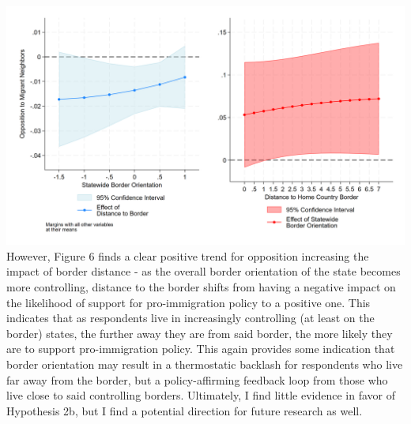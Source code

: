\documentclass[12pt,]{article}
\begin{document}
\includegraphics{figures/m4a_marginal_1.png} However, Figure 6 finds a
clear positive trend for opposition increasing the impact of border
distance - as the overall border orientation of the state becomes more
controlling, distance to the border shifts from having a negative impact
on the likelihood of support for pro-immigration policy to a positive
one. This indicates that as respondents live in increasingly controlling
(at least on the border) states, the further away they are from said
border, the more likely they are to support pro-immigration policy. This
again provides some indication that border orientation may result in a
thermostatic backlash for respondents who live far away from the border,
but a policy-affirming feedback loop from those who live close to said
controlling borders. Ultimately, I find little evidence in favor of
Hypothesis 2b, but I find a potential direction for future research as
well.
\end{document}
